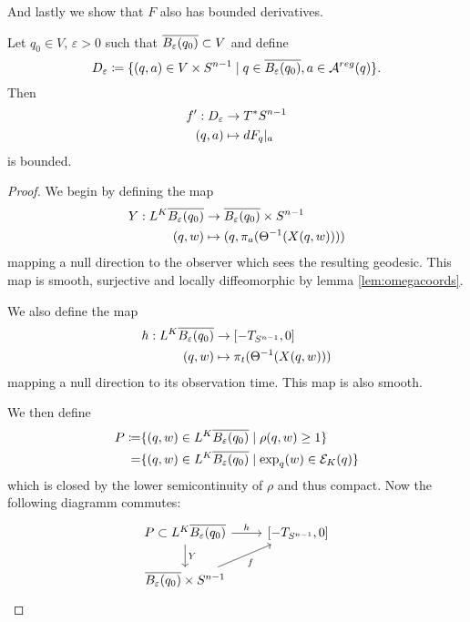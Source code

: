 And lastly we show that $F$ also has bounded derivatives.
\begin{proposition}\label{prop:dfbounded}
    Let $q_0\in V$, $\varepsilon>0$ such that ${\overline{B_\varepsilon(q_0)}}\subset V$ and define 
    \[
        D_\varepsilon\coloneqq \{(q,a)\in V\times {S^{n-1}} \mid q\in {\overline{B_\varepsilon(q_0)}}, a\in {{\mathcal{A}}^{reg}}(q)\}.
    \]
    Then 
    \begin{align*}
        f':D_\varepsilon &\to T^*{S^{n-1}} \\
        (q,a)&\mapsto dF_q\rvert_a
    \end{align*}
    is bounded.
\end{proposition}
\begin{proof}

    We begin by defining the map
    \begin{align*}
        Y:L^K{\overline{B_\varepsilon(q_0)}}&\to {\overline{B_\varepsilon(q_0)}}\times {S^{n-1}} \\
        (q,w)&\mapsto (q,\pi_a(\Theta^{-1}(X(q,w))))
    \end{align*} mapping a null direction to the observer which sees the resulting geodesic. This map is smooth, surjective and locally diffeomorphic by lemma \ref{lem:omegacoords}.

    We also define the map
    \begin{align*}
        h:L^K{\overline{B_\varepsilon(q_0)}}&\to [-T_{{S^{n-1}}},0] \\
        (q,w)&\mapsto \pi_t(\Theta^{-1}(X(q,w)))
    \end{align*} mapping a null direction to its observation time. This map is also smooth.

    We then define 
    \begin{align*}
        P\coloneqq & \{(q,w)\in L^K{\overline{B_\varepsilon(q_0)}} \mid \rho(q,w)\ge 1\}\\
        =& \{(q,w)\in L^K{\overline{B_\varepsilon(q_0)}} \mid \exp_q(w)\in {{\mathcal{E}}_K}(q)\}
    \end{align*} which is closed by the lower semicontinuity of $\rho$ and thus compact.
    Now the following diagramm commutes:
    \[\begin{tikzcd}
        {P\subset L^K\cl{B_\varepsilon(q_0)}} & {[-T_\sn,0]} \\
        {\cl{B_\varepsilon(q_0)}\times S^{n-1}}
        \arrow["Y", from=1-1, to=2-1]
        \arrow["h", from=1-1, to=1-2]
        \arrow["f"', from=2-1, to=1-2]
    \end{tikzcd}\]


\end{proof}
